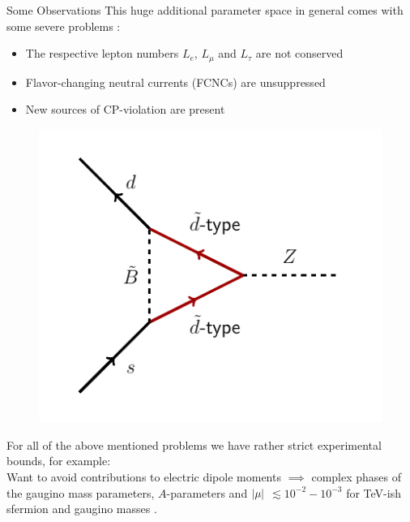 \begin{frame}{Some Observations }
This huge additional parameter space in general comes with some severe problems :\\[1em]
\begin{minipage}{0.7\textwidth}
	\begin{itemize}
	\item The respective \alert{lepton numbers} $L_{e}$, $L_{\mu}$ and $L_{\tau}$ are not conserved \lightning \\[1em]
	\item \alert{Flavor-changing neutral currents} (FCNCs) are unsuppressed \lightning\\[1em]
	\item New sources of \alert{CP-violation} are present \lightning \\[2em]
\end{itemize}
\end{minipage}
\begin{minipage}{0.29\textwidth}
	\begin{figure}
	\centering
		\includegraphics[scale = 0.6]{figures/fcnc_diagram}
	\end{figure}
\end{minipage}

For all of the above mentioned problems we have rather strict experimental bounds, for example:\\[1em]
Want to avoid contributions to \alert{electric dipole moments} $\implies$ complex phases of the gaugino mass parameters, $A$-parameters and $ \abs{\mu}$ $\lesssim  10^{-2} - 10^{-3}$ for TeV-ish sfermion and gaugino masses \cite{Fischler1992}.
\end{frame}

